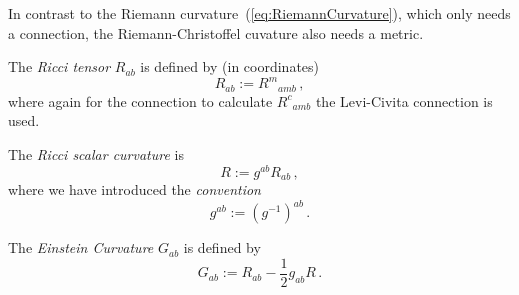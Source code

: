 \begin{note}
    In contrast to the Riemann curvature~(\ref{eq:RiemannCurvature}), 
    which only needs a connection, the Riemann-Christoffel cuvature also needs a metric.
\end{note}
\begin{defn}
    The \textit{Ricci tensor} $R_{ab}$ is defined by (in coordinates)
    \begin{equation}
        R_{ab} := R^m{}_{amb}\,,
    \end{equation}
    where again for the connection to calculate $R^c{}_{amb}$ the Levi-Civita connection is used.
\end{defn}
\begin{defn}
    The \textit{Ricci scalar curvature} is
    \begin{equation}
        R := g^{ab}R_{ab}\,,
    \end{equation}
    where we have introduced the \textit{convention}
    \begin{equation}
        g^{ab} := (g^{-1})^{ab} \,.
    \end{equation}
\end{defn}
\begin{defn}
    The \textit{Einstein Curvature} $G_{ab}$ is defined by
    \begin{equation}
        G_{ab} := R_{ab} - \frac{1}{2} g_{ab} R\,.
    \end{equation}
\end{defn}


